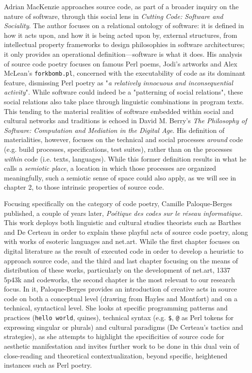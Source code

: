 Adrian MacKenzie approaches source code, as part of a broader inquiry on the nature of software, through this social lens in \emph{Cutting Code: Software and Sociality}\cite{mackenzie_cutting_2006}. The author focuses on a relational ontology of software: it is defined in how it acts upon, and how it is being acted upon by, external structures, from intellectual property frameworks to design philosophies in software architectures; it only provides an operational definition—software is what it does. His analysis of source code poetry focuses on famous Perl poems, Jodi's artworks and Alex McLean's \lstinline{forkbomb.pl}, concerned with the executability of code as its dominant feature, dismissing Perl poetry as "\emph{a relatively innocuous and inconsequential activity}"\cite{mackenzie_cutting_2006}. While software could indeed be a "patterning of social relations"\cite{mackenzie_cutting_2006}, these social relations also take place through linguistic combinations in program texts. This tending to the material realities of software embedded within social and cultural networks and traditions is echoed in David M. Berry's \emph{The Philosophy of Software: Computation and Mediation in the Digital Age}. His definition of materialities, however, focuses on the technical and social processes \emph{around} code (e.g. build processes, specifications, test suites), rather than on the processes \emph{within} code (i.e. texts, languages). While this former definition results in what he calls a \emph{semiotic place}\cite{berry_philosophy_2011}, a location in which those processes are organized meaningfully, such a semiotic sense of space could also apply, as we will see in chapter 2, to those intrinsic properties of source code.

Focusing specifically on the category of code poetry, Camille Paloque-Berges published, a couple of years later, \emph{Poétique des codes sur le réseau informatique}\cite{paloque-berges_poetique_2009}. This work deploys both linguistic and cultural studies theorists such as Barthes and De Certeau in order to explain these playful acts of source code poetry, along with works of esoteric languages and net.art. While the first chapter focuses on digital literature as the result of executed code in order to develop a heuristic to approach source code, and the third and last chapter focusing on the means of distribution of these works, particularly on the development of net.art, 1337 5p43k and codeworks, the second chapter is the most relevant to our research focus. In it, Paloque-Berges provides an introduction of creative acts in source code on both a conceptual level (drawing from Hayles and Montfort) and on a technical, syntactical level. She looks at specific programming patterns and practices (\lstinline{hello world}, quines), technical syntax (e.g. \lstinline{$}, \lstinline{@} as Perl tokens for expressing singular or plurals) and cultural paradigms (De Certeau's tactics and strategies), as she attempts to highlight the specificities of source code for aesthetic manifestation and invites further work to be done in this dual vein of close-reading and theoretical contextualization, beyond specific, heightened instances such as Perl poetry.

